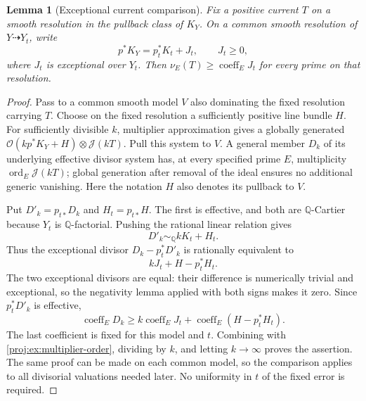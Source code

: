 \documentclass[11pt,letterpaper]{article}
\newtheorem{lemma}[theorem]{Lemma}
\theoremstyle{definition}
\theoremstyle{remark}
\begin{document}
\begin{lemma}[Exceptional current comparison]\label{proj:ex:current-comparison}
Fix a positive current \(T\) on a smooth resolution in the
pullback class of \(K_Y\). On a common smooth resolution of
\(Y\dashrightarrow Y_t\), write
\[
 p^*K_Y=p_t^*K_t+J_t,\qquad J_t\geq0,
\]
where \(J_t\) is exceptional over \(Y_t\).
Then \(\nu_E(T)\geq\operatorname{coeff}_E J_t\) for every
prime on that resolution.
\end{lemma}
\begin{proof}
Pass to a common smooth model \(V\) also dominating the
fixed resolution carrying \(T\). Choose on the fixed
resolution a sufficiently positive line bundle \(H\).
For sufficiently divisible \(k\), multiplier approximation
gives a globally generated
\(\mathcal{O}(kp^*K_Y+H)\otimes\mathcal J(kT)\).
Pull this system to \(V\). A general member \(D_k\) of its
underlying effective divisor system has, at every specified
prime \(E\), multiplicity
\(\operatorname{ord}_E\mathcal J(kT)\); global generation after removal
of the ideal ensures no additional generic vanishing.
Here the notation \(H\) also denotes its pullback to \(V\).

Put \(D'_k=p_{t*}D_k\) and \(H_t=p_{t*}H\). The first is
effective, and both are \(\mathbb{Q}\)-Cartier because \(Y_t\) is
\(\mathbb{Q}\)-factorial. Pushing the rational linear relation gives
\[
 D'_k\sim_\mathbb{Q} kK_t+H_t.
\]
Thus the exceptional divisor
\(D_k-p_t^*D'_k\) is rationally equivalent to
\[
 kJ_t+H-p_t^*H_t.
\]
The two exceptional divisors are equal: their difference is
numerically trivial and exceptional, so the negativity lemma
applied with both signs makes it zero. Since
\(p_t^*D'_k\) is effective,
\[
 \operatorname{coeff}_E D_k
 \geq k\operatorname{coeff}_E J_t
       +\operatorname{coeff}_E(H-p_t^*H_t).
 \]
The last coefficient is fixed for this model and \(t\).
Combining with \eqref{proj:ex:multiplier-order}, dividing by
\(k\), and letting \(k\to\infty\) proves the assertion.
The same proof can be made on each common model, so the
comparison applies to all divisorial valuations needed
later. No uniformity in \(t\) of the fixed error is required.
\end{proof}
\end{document}
